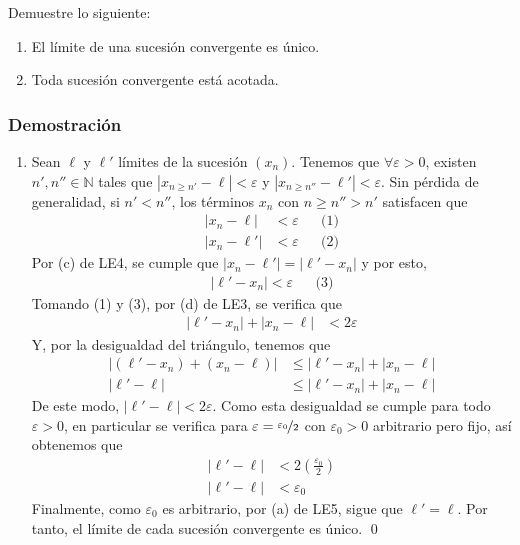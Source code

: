 \documentclass[11pt]{article}
\newcommand{\N}{\mathbb{N}}
\begin{document}
Demuestre lo siguiente:

\begin{enumerate}[label=\alph*)]
 \item El límite de una sucesión convergente es único.
 \item Toda sucesión convergente está acotada.
\end{enumerate}

\subsubsection*{Demostración}

\begin{enumerate}[label=\alph*)]
 \item Sean $\ell$ y $\ell'$ límites de la sucesión $(x_n)$. Tenemos que $\forall \varepsilon>0$, existen $n',n'' \in \N$ tales que $|x_{n\geq n'}-\ell|<\varepsilon$ y $|x_{n\geq n''}-\ell'|<\varepsilon$. Sin pérdida de generalidad, si $n'<n''$, los términos $x_n$ con $n\geq n''>n'$ satisfacen que \begin{align*}
  |x_n-\ell| &<\varepsilon && \text{(1)}\\
  |x_n-\ell'| &<\varepsilon && \text{(2)}
 \end{align*}
 Por (c) de LE4, se cumple que $|x_n-\ell'|=|\ell'-x_n|$ y por esto, \begin{align*}
  |\ell'-x_n|<\varepsilon && \text{(3)}
 \end{align*}
 Tomando (1) y (3), por (d) de LE3, se verifica que \begin{align*}
  |\ell'-x_n| + |x_n-\ell| &< 2\varepsilon
 \end{align*}
 Y, por la desigualdad del triángulo, tenemos que \begin{align*}
  \big|(\ell'-x_n)+(x_n-\ell)\big| &\leq |\ell'-x_n| + |x_n-\ell|\\
  |\ell'-\ell| &\leq |\ell'-x_n| + |x_n-\ell|
 \end{align*}
 De este modo, $|\ell'-\ell| < 2\varepsilon$. Como esta desigualdad se cumple para todo $\varepsilon>0$, en particular se verifica para $\varepsilon=\nicefrac{\varepsilon_0}{2}$ con $\varepsilon_0>0$ arbitrario pero fijo, así obtenemos que \begin{align*}
  |\ell'-\ell| &< 2 \left(\frac{\varepsilon_0}{2}\right)\\
  |\ell'-\ell| &< \varepsilon_0
 \end{align*}
 Finalmente, como $\varepsilon_0$ es arbitrario, por (a) de LE5, sigue que $\ell'=\ell$. Por tanto, el límite de cada sucesión convergente es único. \qed

\end{enumerate}
\end{document}
